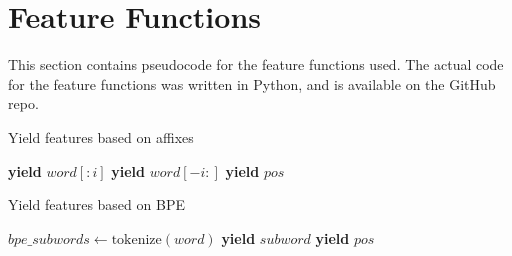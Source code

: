 \documentclass{article}
\begin{document}
\printbibliography

\appendix

\section{Feature Functions}\label{sec:feat_fn}

This section contains pseudocode for the feature functions used. The actual
code for the feature functions was written in Python, and is available on the
GitHub repo.

\begin{algorithm}
\caption{Yield features based on affixes}
\label{alg:affix}
\begin{algorithmic}
        \State \textbf{yield} $word[{:}i]$
        \State \textbf{yield} $word[-i{:}]$
    \EndFor
    \State \textbf{yield} $pos$
\EndProcedure
\end{algorithmic}
\end{algorithm}

\begin{algorithm}
\caption{Yield features based on BPE}
\label{alg:bpe}
\begin{algorithmic}
    \State $bpe\_subwords \gets \text{tokenize}(word)$
        \State \textbf{yield} $subword$
    \EndFor
    \State \textbf{yield} $pos$
\EndProcedure
\end{algorithmic}
\end{algorithm}
\end{document}
